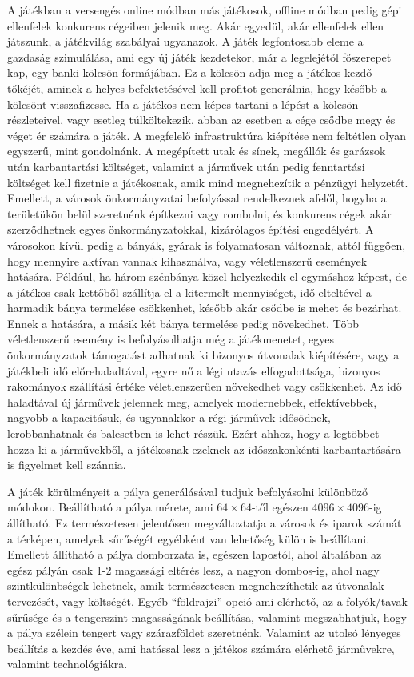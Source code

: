 A játékban a versengés online módban más játékosok, offline módban pedig gépi ellenfelek konkurens cégeiben jelenik meg. Akár egyedül, akár ellenfelek ellen játszunk, a játékvilág szabályai ugyanazok. A játék legfontosabb eleme a gazdaság szimulálása, ami egy új játék kezdetekor, már a legelejétől főszerepet kap, egy banki kölcsön formájában. Ez a kölcsön adja meg a játékos kezdő tőkéjét, aminek a helyes befektetésével kell profitot generálnia, hogy később a kölcsönt visszafizesse. Ha a játékos nem képes tartani a lépést a kölcsön részleteivel, vagy esetleg túlköltekezik, abban az esetben a cége csődbe megy és véget ér számára a játék. A megfelelő infrastruktúra kiépítése nem feltétlen olyan egyszerű, mint gondolnánk. A megépített utak és sínek, megállók és garázsok után karbantartási költséget, valamint a járművek után pedig fenntartási költséget kell fizetnie a játékosnak, amik mind megnehezítik a pénzügyi helyzetét. Emellett, a városok önkormányzatai befolyással rendelkeznek afelől, hogyha a területükön belül szeretnénk építkezni vagy rombolni, és konkurens cégek akár szerződhetnek egyes önkormányzatokkal, kizárólagos építési engedélyért. A városokon kívül pedig a bányák, gyárak is folyamatosan változnak, attól függően, hogy mennyire aktívan vannak kihasználva, vagy véletlenszerű események hatására. Például, ha három szénbánya közel helyezkedik el egymáshoz képest, de a játékos csak kettőből szállítja el a kitermelt mennyiséget, idő elteltével a harmadik bánya termelése csökkenhet, később akár csődbe is mehet és bezárhat. Ennek a hatására, a másik két bánya termelése pedig növekedhet. Több véletlenszerű esemény is befolyásolhatja még a játékmenetet, egyes önkormányzatok támogatást adhatnak ki bizonyos útvonalak kiépítésére, vagy a játékbeli idő előrehaladtával, egyre nő a légi utazás elfogadottsága, bizonyos rakományok szállítási értéke véletlenszerűen növekedhet vagy csökkenhet. Az idő haladtával új járművek jelennek meg, amelyek modernebbek, effektívebbek, nagyobb a kapacitásuk, és ugyanakkor a régi járművek idősödnek, lerobbanhatnak és balesetben is lehet részük. Ezért ahhoz, hogy a legtöbbet hozza ki a járművekből, a játékosnak ezeknek az időszakonkénti karbantartására is figyelmet kell szánnia.

A játék körülményeit a pálya generálásával tudjuk befolyásolni különböző módokon. Beállítható a pálya mérete, ami $64 \times 64$-től egészen $4096 \times 4096$-ig állítható. Ez természetesen  jelentősen megváltoztatja a városok és iparok számát a térképen, amelyek sűrűségét egyébként van lehetőség külön is beállítani. Emellett állítható a pálya domborzata is, egészen lapostól, ahol általában az egész pályán csak 1-2 magassági eltérés lesz, a nagyon dombos-ig, ahol nagy szintkülönbségek lehetnek, amik természetesen megnehezíthetik az útvonalak tervezését, vagy költségét. Egyéb “földrajzi” opció ami elérhető, az a folyók/tavak sűrűsége és a tengerszint magasságának beállítása, valamint megszabhatjuk, hogy a pálya szélein tengert vagy szárazföldet szeretnénk. Valamint az utolsó lényeges beállítás a kezdés éve, ami hatással lesz a játékos számára elérhető járművekre, valamint technológiákra.

